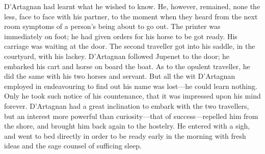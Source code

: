 D'Artagnan had learnt what he wished to know. He, however, remained, none the less, face to face with his partner, to the moment when they heard from the next room symptoms of a person's being about to go out. The printer was immediately on foot; he had given orders for his horse to be got ready. His carriage was waiting at the door. The second traveller got into his saddle, in the courtyard, with his lackey. D'Artagnan followed Jupenet to the door; he embarked his cart and horse on board the boat. As to the opulent traveller, he did the same with his two horses and servant. But all the wit D'Artagnan employed in endeavouring to find out his name was lost—he could learn nothing. Only he took such notice of his countenance, that it was impressed upon his mind forever. D'Artagnan had a great inclination to embark with the two travellers, but an interest more powerful than curiosity—that of success—repelled him from the shore, and brought him back again to the hostelry. He entered with a sigh, and went to bed directly in order to be ready early in the morning with fresh ideas and the sage counsel of sufficing sleep. 